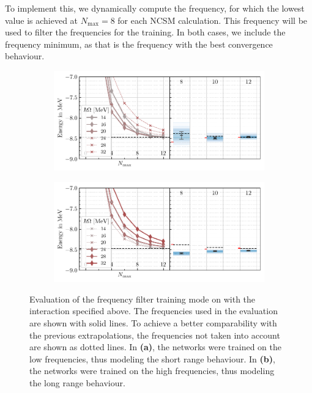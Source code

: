 To implement this, we dynamically compute the frequency, for which the lowest value is achieved at $N_\mathrm{max} = 8$ for each NCSM calculation. This frequency will be used to filter the frequencies for the training. In both cases, we include the frequency minimum, as that is the frequency with the best convergence behaviour.



\begin{figure}[H]
  \begin{subfigure}{\textwidth}
    \centering
    \includegraphics{media/outlook_frequency_lower.pdf}
    \caption{}
  \end{subfigure}
  \begin{subfigure}{\textwidth}
    \centering
    \includegraphics{media/outlook_frequency_higher.pdf}
    \caption{}
  \end{subfigure}
  \caption{Evaluation of the frequency filter training mode on  with the interaction specified above. The frequencies used in the evaluation are shown with solid lines. To achieve a better comparability with the previous extrapolations, the frequencies not taken into account are shown as dotted lines. In \textbf{(a)}, the networks were trained on the low frequencies, thus modeling the short range behaviour. In \textbf{(b)}, the networks were trained on the high frequencies, thus modeling the long range behaviour.}
  \label{fig:eval_freqfilter}
\end{figure}

